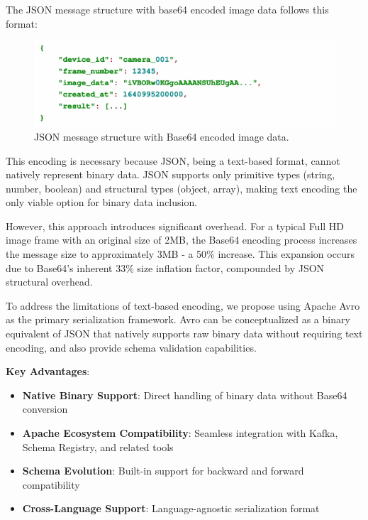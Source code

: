 The JSON message structure with base64 encoded image data follows this format:

\begin{figure}[htbp]
    \centering
    \includegraphics[width=1\textwidth]{Figure/json_base64.png}
    \caption{JSON message structure with Base64 encoded image data.}
    \label{fig:json_base64}
\end{figure}

This encoding is necessary because JSON, being a text-based format, cannot natively represent binary data. JSON supports only primitive types (string, number, boolean) and structural types (object, array), making text encoding the only viable option for binary data inclusion.

However, this approach introduces significant overhead. For a typical Full HD image frame with an original size of 2MB, the Base64 encoding process increases the message size to approximately 3MB - a 50\% increase. This expansion occurs due to Base64's inherent 33\% size inflation factor, compounded by JSON structural overhead.


To address the limitations of text-based encoding, we propose using Apache Avro as the primary serialization framework. Avro can be conceptualized as a binary equivalent of JSON that natively supports raw binary data without requiring text encoding, and also provide schema validation capabilities.

\textbf{Key Advantages}:
\begin{itemize}
    \item \textbf{Native Binary Support}: Direct handling of binary data without Base64 conversion
    \item \textbf{Apache Ecosystem Compatibility}: Seamless integration with Kafka, Schema Registry, and related tools
    \item \textbf{Schema Evolution}: Built-in support for backward and forward compatibility
    \item \textbf{Cross-Language Support}: Language-agnostic serialization format
\end{itemize}

